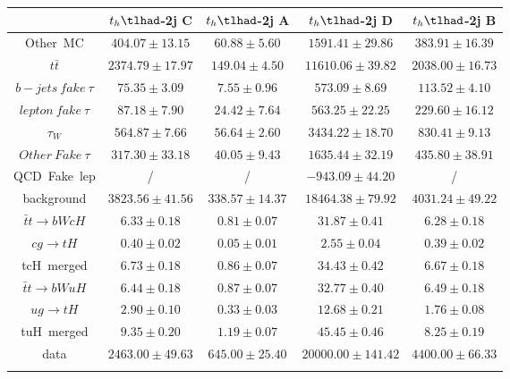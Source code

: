 \begin{tabular}{ccccc} \toprule\toprule
 & $t_{h}\tlhad$-2j C & $t_{h}\tlhad$-2j A & $t_{h}\tlhad$-2j D & $t_{h}\tlhad$-2j B\\\midrule
\hspace{3mm}Other~MC & $404.07\pm13.15$ & $60.88\pm5.60$ & $1591.41\pm29.86$ & $383.91\pm16.39$\\
\hspace{3mm}$t\bar{t}$ & $2374.79\pm17.97$ & $149.04\pm4.50$ & $11610.06\pm39.82$ & $2038.00\pm16.73$\\
\hspace{3mm}$b-jets~fake~\tau$ & $75.35\pm3.09$ & $7.55\pm0.96$ & $573.09\pm8.69$ & $113.52\pm4.10$\\
\hspace{3mm}$lepton~fake~\tau$ & $87.18\pm7.90$ & $24.42\pm7.64$ & $563.25\pm22.25$ & $229.60\pm16.12$\\
\hspace{3mm}$\tau_{W}$ & $564.87\pm7.66$ & $56.64\pm2.60$ & $3434.22\pm18.70$ & $830.41\pm9.13$\\
\hspace{3mm}$Other~Fake~\tau$ & $317.30\pm33.18$ & $40.05\pm9.43$ & $1635.44\pm32.19$ & $435.80\pm38.91$\\
\hspace{3mm}QCD~Fake~lep &  / &  / & $-943.09\pm44.20$ &  /\\
background & $3823.56\pm41.56$ & $338.57\pm14.37$ & $18464.38\pm79.92$ & $4031.24\pm49.22$\\\midrule
\hspace{3mm}$\bar{t}t\to bWcH$ & $6.33\pm0.18$ & $0.81\pm0.07$ & $31.87\pm0.41$ & $6.28\pm0.18$\\
\hspace{3mm}$cg\to tH$ & $0.40\pm0.02$ & $0.05\pm0.01$ & $2.55\pm0.04$ & $0.39\pm0.02$\\
tcH~merged & $6.73\pm0.18$ & $0.86\pm0.07$ & $34.43\pm0.42$ & $6.67\pm0.18$\\
\hspace{3mm}$\bar{t}t\to bWuH$ & $6.44\pm0.18$ & $0.87\pm0.07$ & $32.77\pm0.40$ & $6.49\pm0.18$\\
\hspace{3mm}$ug\to tH$ & $2.90\pm0.10$ & $0.33\pm0.03$ & $12.68\pm0.21$ & $1.76\pm0.08$\\
tuH~merged & $9.35\pm0.20$ & $1.19\pm0.07$ & $45.45\pm0.46$ & $8.25\pm0.19$\\\midrule
data & $2463.00\pm49.63$ & $645.00\pm25.40$ & $20000.00\pm141.42$ & $4400.00\pm66.33$\\
\bottomrule\bottomrule\\
\end{tabular}
